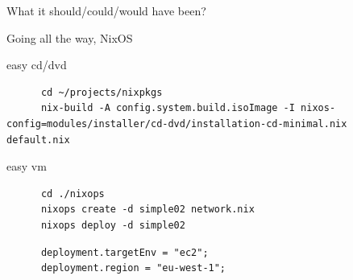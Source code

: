 \documentclass[presentation]{beamer}
\begin{document}
\begin{frame}[label={sec:org72632d2},fragile]{What it should/could/would have been?}
\begin{block}{Going all the way, NixOS}
\begin{block}{easy cd/dvd}
\begin{verbatim}
      cd ~/projects/nixpkgs
      nix-build -A config.system.build.isoImage -I nixos-config=modules/installer/cd-dvd/installation-cd-minimal.nix default.nix
\end{verbatim}
\end{block}
\begin{block}{easy vm}
\begin{verbatim}
      cd ./nixops
      nixops create -d simple02 network.nix
      nixops deploy -d simple02
\end{verbatim}
\begin{verbatim}
      deployment.targetEnv = "ec2";
      deployment.region = "eu-west-1";
\end{verbatim}
\end{block}
\end{block}
\end{frame}
\end{document}
